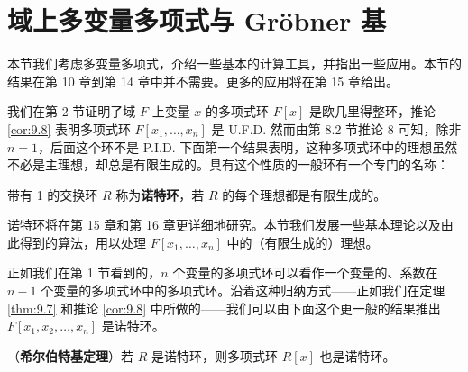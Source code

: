\section{域上多变量多项式与 Gröbner 基}

本节我们考虑多变量多项式，介绍一些基本的计算工具，并指出一些应用。本节的结果在第 10 章到第 14 章中并不需要。更多的应用将在第 15 章给出。

我们在第 2 节证明了域 \(F\) 上变量 \(x\) 的多项式环 \(F[x]\) 是欧几里得整环，推论 \ref{cor:9.8} 表明多项式环 \(F[x_1, \ldots, x_n]\) 是 U.F.D. 然而由第 8.2 节推论 8 可知，除非 \(n = 1\)，后面这个环不是 P.I.D. 下面第一个结果表明，这种多项式环中的理想虽然不必是主理想，却总是有限生成的。具有这个性质的一般环有一个专门的名称：

\begin{definition}
带有 1 的交换环 \(R\) 称为\textbf{诺特环}，若 \(R\) 的每个理想都是有限生成的。
\end{definition}

诺特环将在第 15 章和第 16 章更详细地研究。本节我们发展一些基本理论以及由此得到的算法，用以处理 \(F[x_1, \ldots, x_n]\) 中的（有限生成的）理想。

正如我们在第 1 节看到的，\(n\) 个变量的多项式环可以看作一个变量的、系数在 \(n-1\) 个变量的多项式环中的多项式环。沿着这种归纳方式——正如我们在定理 \ref{thm:9.7} 和推论 \ref{cor:9.8} 中所做的——我们可以由下面这个更一般的结果推出 \(F[x_1, x_2, \ldots, x_n]\) 是诺特环。

\begin{theorem}\label{thm:9.21}
（\textbf{希尔伯特基定理}）若 \(R\) 是诺特环，则多项式环 \(R[x]\) 也是诺特环。
\end{theorem}

